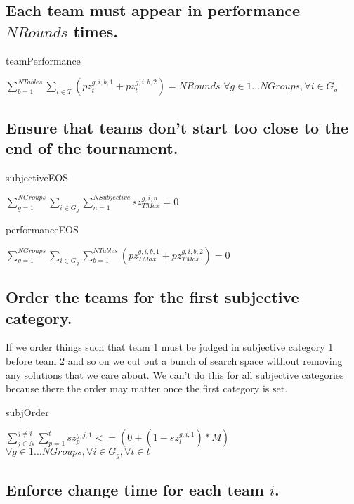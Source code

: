 \documentclass[letterpaper,11pt]{report}
\begin{document}
\FloatBarrier
\subsection{Each team must appear in performance $NRounds$ times.}

\begin{algorithm}
\caption{teamPerformance}
$\sum\limits_{b=1}^{NTables} \sum\limits_{t \in T} ( pz_{t}^{g,i,b,1} + pz_{t}^{g,i,b,2} ) = NRounds$
\hfill $
\forall g \in 1 \dots NGroups,
\forall i \in G_{g}
$
\end{algorithm}

\FloatBarrier
\subsection{Ensure that teams don't start too close to the end of the
  tournament.}
\begin{algorithm}
\caption{subjectiveEOS}
$
\sum\limits_{g=1}^{NGroups}
\sum\limits_{i \in G_{g}}
  \sum\limits_{n=1}^{NSubjective} sz_{TMax}^{g,i,n} = 0$
\end{algorithm}

\begin{algorithm}
\caption{performanceEOS}
$
\sum\limits_{g=1}^{NGroups}
\sum\limits_{i \in G_{g}}
  \sum\limits_{b=1}^{NTables}
  ( pz_{TMax}^{g,i,b,1} + pz_{TMax}^{g,i,b,2} ) = 0$
\end{algorithm}

\FloatBarrier
\subsection{Order the teams for the first subjective category.}
If we order things such that team 1 must be judged in subjective category 1
before team 2 and so on we cut out a bunch of search space without removing
any solutions that we care about. We can't do this for all subjective
categories because there the order may matter once the first category is
set.
\begin{algorithm}
\caption{subjOrder}
$
\sum\limits_{j \in N}^{j \ne i}
  \sum\limits_{p=1}^{t} sz_{p}^{g,j,1} <= 
( 0 + ( 1 - sz_{t}^{g,i,1} ) * M )$
\hfill $
\forall g \in 1 \dots NGroups,
\forall i \in G_{g}, 
\forall t \in t
$
\end{algorithm}

\FloatBarrier
\subsection{Enforce change time for each team $i$.}
\end{document}

